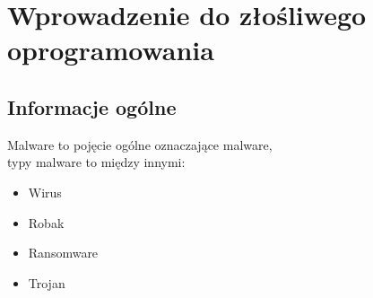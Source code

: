 \chapter{Wprowadzenie do złośliwego oprogramowania}
\newpage
\section{Informacje ogólne}
\noindent Malware to pojęcie ogólne oznaczające \ac{malware},\\
typy malware to między innymi:
\begin{itemize}
    \item Wirus
    \item Robak
    \item Ransomware
    \item Trojan \cite{prezentacja}
\end{itemize}
\newpage